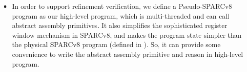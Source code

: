 \begin{itemize}
	
	

    \item 
    In order to support refinement verification, we define a 
    Pseudo-SPARCv8 program as our high-level program, which 
    is multi-threaded and can call abstract 
    assembly primitives. It also simplifies 
    the sophisticated register window mechanism in SPARCv8, 
    and makes the program state 
    simpler than the physical SPARCv8 program 
    (defined in \Sec{\ref{sec:modeling}}). 
    So, it can provide some convenience 
    to write the abstract assembly primitive 
    and reason in high-level program. 
    

\end{itemize}
